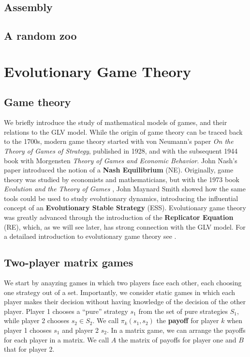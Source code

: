 \documentclass[]{book}
\begin{document}
\hypertarget{assembly}{%
\section{Assembly}\label{assembly}}

\hypertarget{a-random-zoo}{%
\section{A random zoo}\label{a-random-zoo}}

\hypertarget{games}{%
\chapter{Evolutionary Game Theory}\label{games}}

\hypertarget{game-theory}{%
\section{Game theory}\label{game-theory}}

We briefly introduce the study of mathematical models of games, and their relations to the GLV model. While the origin of game theory can be traced back to the 1700s, modern game theory started with von Neumann's paper \emph{On the Theory of Games of Strategy}, published in 1928, and with the subsequent 1944 book with Morgensten \emph{Theory of Games and Economic Behavior}. John Nash's paper \citep{nash1950equilibrium} introduced the notion of a \textbf{Nash Equilibrium} (NE). Originally, game theory was studied by economists and mathematicians, but with the 1973 book \emph{Evolution and the Theory of Games} \citep{smith1982evolution}, John Maynard Smith showed how the same tools could be used to study evolutionary dynamics, introducing the influential concept of an \textbf{Evolutionary Stable Strategy} (ESS). Evolutionary game theory was greatly advanced through the introduction of the \textbf{Replicator Equation} (RE), which, as we will see later, has strong connection with the GLV model. For a detailaed introduction to evolutionary game theory see \citet{hofbauer1998evolutionary}.

\hypertarget{two-player-matrix-games}{%
\section{Two-player matrix games}\label{two-player-matrix-games}}

We start by anayzing games in which two players face each other, each choosing one strategy out of a set. Importantly, we consider static games in which each player makes their decision without having knowledge of the decision of the other player. Player 1 chooses a ``pure'' strategy \(s_1\) from the set of pure strategies \(S_1\), while player 2 chooses \(s_2 \in S_2\). We call \(\pi_k (s_1, s_2)\) the \textbf{payoff} for player \(k\) when player 1 chooses \(s_1\) and player 2 \(s_2\). In a matrix game, we can arrange the payoffs for each player in a matrix. We call \(A\) the matrix of payoffs for player one and \(B\) that for player 2.
\end{document}

